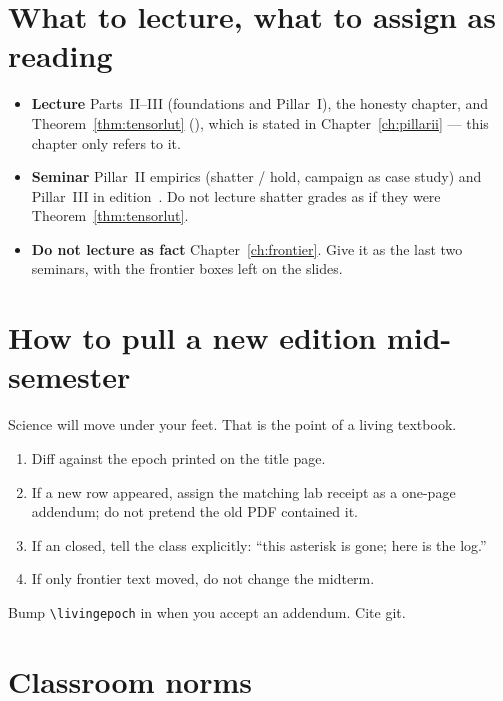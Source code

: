 \section{What to lecture, what to assign as reading}

\begin{itemize}
  \item \textbf{Lecture} Parts~II--III (foundations and Pillar~I), the
        honesty chapter, and Theorem~\ref{thm:tensorlut} (), which is
        stated in Chapter~\ref{ch:pillarii} --- this chapter only refers to it.
  \item \textbf{Seminar} Pillar~II empirics (shatter / hold, campaign as
        case study) and Pillar~III in edition~\corpusedition{}.
        Do not lecture shatter grades as if they were Theorem~\ref{thm:tensorlut}.
  \item \textbf{Do not lecture as fact} Chapter~\ref{ch:frontier}.
        Give it as the last two seminars, with the frontier boxes left on
        the slides.
\end{itemize}

\section{How to pull a new edition mid-semester}

Science will move under your feet.
That is the point of a living textbook.

\begin{enumerate}
  \item Diff  against the epoch printed on
        the title page.
  \item If a new  row appeared, assign the matching lab receipt as a
        one-page addendum; do not pretend the old PDF contained it.
  \item If an  closed, tell the class explicitly: ``this asterisk is
        gone; here is the log.''
  \item If only frontier text moved, do not change the midterm.
\end{enumerate}

Bump \texttt{\textbackslash livingepoch} in 
when you accept an addendum.
Cite git.

\section{Classroom norms}

